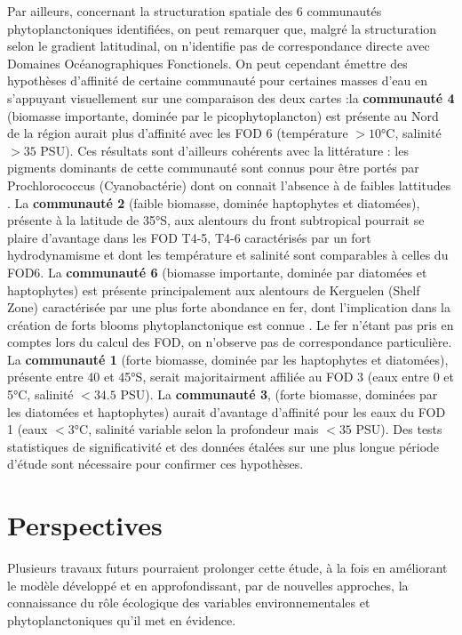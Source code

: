 \documentclass[11pt,a4paper,oneside]{report}
\begin{document}
	Par ailleurs, concernant la structuration spatiale des 6 communautés phytoplanctoniques identifiées, on peut remarquer que, malgré la structuration selon le gradient latitudinal, on n'identifie pas de correspondance directe avec Domaines Océanographiques Fonctionels. On peut cependant émettre des hypothèses d'affinité de certaine communauté pour certaines masses d'eau en s'appuyant visuellement sur une comparaison des deux cartes :la \textbf{ communauté 4} (biomasse importante, dominée par le picophytoplancton) est présente au Nord de la région aurait plus d'affinité avec les FOD 6 (température $> 10$°C, salinité $>35$ PSU). Ces résultats sont d'ailleurs cohérents avec la littérature : les pigments dominants de cette communauté sont connus pour être portés par Prochlorococcus (Cyanobactérie) dont on connait l'absence à de faibles lattitudes \cite{Pan2020}. La \textbf{communauté 2} (faible biomasse, dominée haptophytes et diatomées), présente à la latitude de 35°S, aux alentours du front subtropical pourrait se plaire d'avantage dans les FOD T4-5, T4-6 caractérisés par un fort hydrodynamisme et dont les température et salinité sont comparables à celles du FOD6. La \textbf{communauté 6} (biomasse importante, dominée par diatomées et haptophytes) est présente principalement aux alentours de Kerguelen (Shelf Zone) caractérisée par une plus forte abondance en fer, dont l'implication dans la création de forts blooms phytoplanctonique est connue \cite{Blain2007}. Le fer n'étant pas pris en comptes lors du calcul des FOD, on n'observe pas de correspondance particulière. La \textbf{communauté 1} (forte biomasse, dominée par les haptophytes et diatomées), présente entre 40 et 45°S, serait majoritairment affiliée au FOD 3 (eaux entre 0 et 5°C, salinité $<34.5$ PSU). La \textbf{communauté 3}, (forte biomasse, dominées par les diatomées et haptophytes) aurait d'avantage d'affinité pour les eaux du FOD 1 (eaux $<3$°C, salinité variable selon la profondeur mais $<35$ PSU). Des tests statistiques de significativité et des données étalées sur une plus longue période d'étude sont nécessaire pour confirmer ces hypothèses.
	
	
	
	\section{Perspectives}
	Plusieurs travaux futurs pourraient prolonger cette étude, à la fois en améliorant le modèle développé et en approfondissant, par de nouvelles approches, la connaissance du rôle écologique des variables environnementales et phytoplanctoniques qu'il met en évidence.
	
\end{document}
